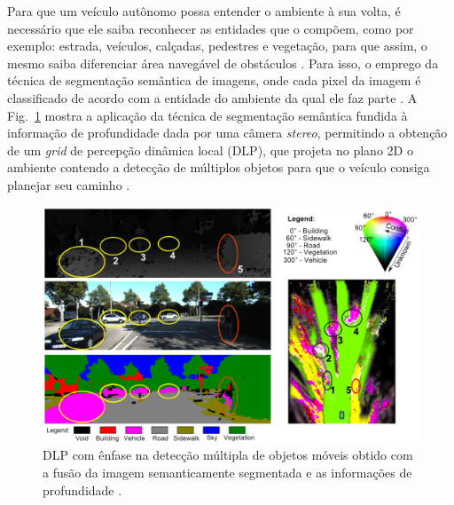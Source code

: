 \documentclass[conference]{IEEEtran}
\begin{document}
Para que um veículo autônomo possa entender o ambiente à sua volta, é necessário que ele saiba reconhecer as entidades que o compõem, como por exemplo: estrada, veículos, calçadas, pedestres e vegetação, para que assim, o mesmo saiba diferenciar área navegável de obstáculos \cite{jebamikyousAutonomousVehiclesPerception2022}. Para isso, o emprego da técnica de segmentação semântica de imagens, onde cada pixel da imagem é classificado de acordo com a entidade do ambiente da qual ele faz parte \cite{he2016ImageSegmentationTechniques}. A Fig.~\ref{fig:dynamiclocalperception} mostra a aplicação da técnica de segmentação semântica fundida à informação de profundidade dada por uma câmera \textit{stereo}, permitindo a obtenção de um \textit{grid} de percepção dinâmica local (DLP), que projeta no plano 2D o ambiente contendo a detecção de múltiplos objetos para que o veículo consiga planejar seu caminho \cite{vitor2021ModelingEvidentialGrids}.

\begin{figure}[h!]
	\centering
	\includegraphics[width=\linewidth]{img/dynamic_local_perception}
	\caption{DLP com ênfase na detecção múltipla de objetos móveis obtido com a fusão da imagem semanticamente segmentada e as informações de profundidade \cite{vitor2021ModelingEvidentialGrids}.}
	\label{fig:dynamiclocalperception}
\end{figure}
\end{document}
